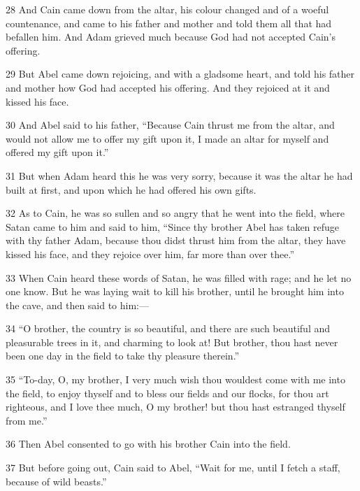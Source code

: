 \par 28 And Cain came down from the altar, his colour changed and of a woeful countenance, and came to his father and mother and told them all that had befallen him. And Adam grieved much because God had not accepted Cain's offering.

\par 29 But Abel came down rejoicing, and with a gladsome heart, and told his father and mother how God had accepted his offering. And they rejoiced at it and kissed his face.

\par 30 And Abel said to his father, “Because Cain thrust me from the altar, and would not allow me to offer my gift upon it, I made an altar for myself and offered my gift upon it.”

\par 31 But when Adam heard this he was very sorry, because it was the altar he had built at first, and upon which he had offered his own gifts.

\par 32 As to Cain, he was so sullen and so angry that he went into the field, where Satan came to him and said to him, “Since thy brother Abel has taken refuge with thy father Adam, because thou didst thrust him from the altar, they have kissed his face, and they rejoice over him, far more than over thee.”

\par 33 When Cain heard these words of Satan, he was filled with rage; and he let no one know. But he was laying wait to kill his brother, until he brought him into the cave, and then said to him:—

\par 34 “O brother, the country is so beautiful, and there are such beautiful and pleasurable trees in it, and charming to look at! But brother, thou hast never been one day in the field to take thy pleasure therein.”

\par 35 “To-day, O, my brother, I very much wish thou wouldest come with me into the field, to enjoy thyself and to bless our fields and our flocks, for thou art righteous, and I love thee much, O my brother! but thou hast estranged thyself from me.”

\par 36 Then Abel consented to go with his brother Cain into the field.

\par 37 But before going out, Cain said to Abel, “Wait for me, until I fetch a staff, because of wild beasts.”

